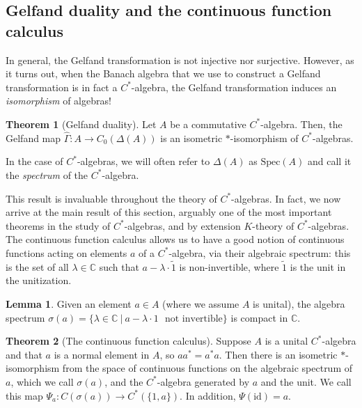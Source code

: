 \documentclass[aps,pra,showpacs,notitlepage,onecolumn,superscriptaddress,nofootinbib]{revtex4-1}
\theoremstyle{definition}
\newtheorem{lemma}{Lemma}[section]
\newtheorem{theorem}{Theorem}[section]
\begin{document}
\subsection{Gelfand duality and the continuous function calculus}

\noindent In general, the Gelfand transformation is not injective nor surjective. However,
as it turns out, when the Banach algebra that we use to construct a Gelfand transformation is in fact a $C^{*}$-algebra, the Gelfand transformation induces an \emph{isomorphism} of algebras!

\begin{theorem}[Gelfand duality]
  Let $A$ be a commutative $C^{*}$-algebra. Then, the Gelfand map $\widehat{\Gamma} : A \rightarrow C_0(\Delta(A))$ is an isometric $*$-isomorphism of $C^{*}$-algebras.
\end{theorem}

\noindent In the case of $C^{*}$-algebras, we will often refer to $\Delta(A)$ as $\text{Spec}(A)$ and call it the \emph{spectrum} of the $C^{*}$-algebra.
\newline

\noindent This result is
invaluable throughout the theory of $C^{*}$-algebras. In fact, we now arrive at the main result of this section, arguably one of the most important theorems in the study of $C^{*}$-algebras, and by extension $K$-theory of $C^{*}$-algebras.
The continuous function calculus allows us to have a good notion of continuous functions acting on elements $a$ of a $C^{*}$-algebra, via their algebraic spectrum: this is the set of all $\lambda \in \mathbb{C}$ such
that $a - \lambda \cdot \widetilde{1}$ is non-invertible, where $\widetilde{1}$ is the unit in the unitization.

\begin{lemma}
  Given an element $a \in A$ (where we assume $A$ is unital), the algebra spectrum $\sigma(a) = \{\lambda \in \mathbb{C} \ | \ a - \lambda \cdot 1 \ \ \ \text{not invertible}\}$ is compact in $\mathbb{C}$.
\end{lemma}

\begin{theorem}[The continuous function calculus]
  Suppose $A$ is a unital $C^{*}$-algebra and that $a$ is a normal element in $A$, so $a a^{*} = a^{*} a$. Then there is an isometric $*$-isomorphism
  from the space of continuous functions on the algebraic spectrum of $a$, which we call $\sigma(a)$, and the $C^{*}$-algebra generated by $a$ and the unit. We call this map $\Psi_a : C(\sigma(a)) \rightarrow C^{*}(\{1, a\})$.
  In addition, $\Psi(\text{id}) = a$.
\end{theorem}
\end{document}
